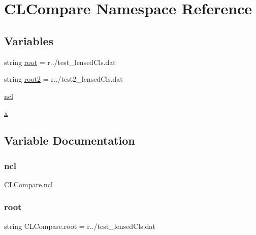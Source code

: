 \hypertarget{namespaceCLCompare}{}\section{C\+L\+Compare Namespace Reference}
\label{namespaceCLCompare}
\subsection*{Variables}
\begin{DoxyCompactItemize}
\item 
string \mbox{\hyperlink{namespaceCLCompare_ab572b837d08acc0b6f64b78c73fd6f17}{root}} = r\textquotesingle{}../test\+\_\+lensed\+Cls.\+dat\textquotesingle{}
\item 
string \mbox{\hyperlink{namespaceCLCompare_ad902e3bc6c9812de6cfa12193ba859ee}{root2}} = r\textquotesingle{}../test2\+\_\+lensed\+Cls.\+dat\textquotesingle{}
\item 
\mbox{\hyperlink{namespaceCLCompare_a5332432f1a10402a33be1327c7e34770}{ncl}}
\item 
\mbox{\hyperlink{namespaceCLCompare_aa592cc9a669aab91e6108f390a41234b}{x}}
\end{DoxyCompactItemize}


\subsection{Variable Documentation}
\mbox{\label{namespaceCLCompare_a5332432f1a10402a33be1327c7e34770}} 
\subsubsection{\texorpdfstring{ncl}{ncl}}
{\footnotesize\ttfamily C\+L\+Compare.\+ncl}

\mbox{\label{namespaceCLCompare_ab572b837d08acc0b6f64b78c73fd6f17}} 
\subsubsection{\texorpdfstring{root}{root}}
{\footnotesize\ttfamily string C\+L\+Compare.\+root = r\textquotesingle{}../test\+\_\+lensed\+Cls.\+dat\textquotesingle{}}

